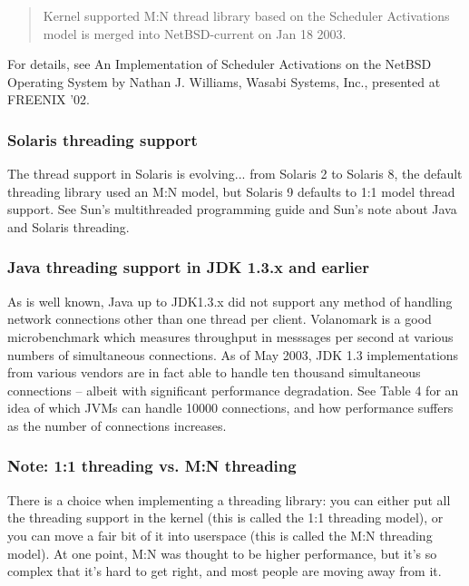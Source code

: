 \documentclass[12pt, twoside, a4paper, xetex]{report}
\begin{document}
\begin{quotation}
Kernel supported M:N thread library based on the Scheduler Activations model is merged into NetBSD-current on Jan 18 2003.
\end{quotation}

For details, see An Implementation of Scheduler Activations on the NetBSD Operating System by Nathan J. Williams, Wasabi Systems, Inc., presented at FREENIX '02.

\subsubsection*{Solaris threading support}

The thread support in Solaris is evolving... from Solaris 2 to Solaris 8, the default threading library used an M:N model, but Solaris 9 defaults to 1:1 model thread support. See Sun's multithreaded programming guide and Sun's note about Java and Solaris threading.

\subsubsection*{Java threading support in JDK 1.3.x and earlier}

As is well known, Java up to JDK1.3.x did not support any method of handling network connections other than one thread per client. Volanomark is a good microbenchmark which measures throughput in messsages per second at various numbers of simultaneous connections. As of May 2003, JDK 1.3 implementations from various vendors are in fact able to handle ten thousand simultaneous connections -- albeit with significant performance degradation. See Table 4 for an idea of which JVMs can handle 10000 connections, and how performance suffers as the number of connections increases.

\subsubsection*{Note: 1:1 threading vs. M:N threading}

There is a choice when implementing a threading library: you can either put all the threading support in the kernel (this is called the 1:1 threading model), or you can move a fair bit of it into userspace (this is called the M:N threading model). At one point, M:N was thought to be higher performance, but it's so complex that it's hard to get right, and most people are moving away from it.
\end{document}

